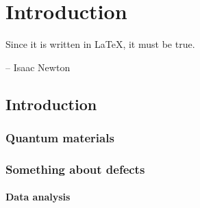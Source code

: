 \chapter{Introduction} \label{chap:chap-1}


\epigraph{Since it is written in \LaTeX, it must be true.}{-- Isaac Newton}





\section{Introduction}

\subsection{Quantum materials}


\subsection{Something about defects}


\subsubsection{Data analysis}
